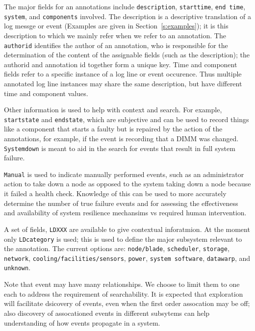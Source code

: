 The major fields for an annotations include \texttt{description}, \texttt{starttime}, \texttt{end time},
\texttt{system}, and \texttt{components} involved.
The description is a descriptive translation of a log messge or event (Examples
are given in Section~\ref{s:examples}); it is this description to which we
mainly refer when we refer to an annotation.
The \texttt{authorid} identifies the author of an annotation, who
is responsible for the determination of the content of the assignable fields
(such as the description); the authorid and annotation id together form a unique key.
Time and component fields refer to a specific instance of a log line or event
occurence. Thus multiple annotated log line instances may share the same description,
but have different time and component values.

Other information is used to help with context and search.
For example, \texttt{startstate} and \texttt{endstate}, which
are subjective and can be used to record things like a component
that starts a faulty but is repaired by the action of the annotations,
for example, if the event is recording that a DIMM was changed.
\texttt{Systemdown} is meant to aid in the search for events that result
in full system failure.

\texttt{Manual} is used to indicate manually performed
events, such as an administrator action to take down a node as opposed
to the system taking down a node because it failed a health check.
Knowledge of this can be used to more accurately determine the
number of true failure events and for assessing the effectiveness
and availability of system resilience mechansims vs required
human intervention.

A set of fields, \texttt{LDXXX} are available to give contextual inforatmion.
At the moment only \texttt{LDcategory} is used; this is used to define the major
subsystem relevant to the annotation. The current options are: \texttt{node/blade},
\texttt{scheduler}, \texttt{storage}, \texttt{network}, \texttt{cooling/facilities/sensors},
\texttt{power}, \texttt{system software}, \texttt{datawarp}, and \texttt{unknown}.

Note that event may have many relationships. We choose to limit them to one each to address
the requirement of searchability. It is expected that exploration will facilitate dsicovery
of events, even when the first order assocation may be off; also discovery of assocationed
events in different subsytems can help understanding of how events propagate in a system.


